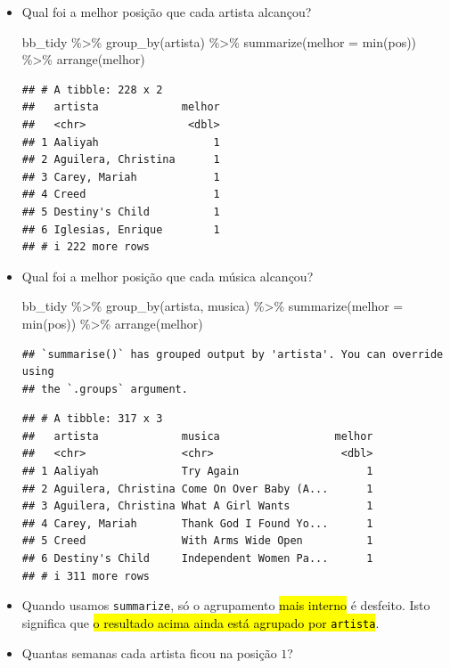 \documentclass[
  11pt]{report}
\newenvironment{Shaded}{\begin{snugshade}}{\end{snugshade}}
\newcommand{\AttributeTok}[1]{\textcolor[rgb]{0.77,0.63,0.00}{#1}}
\newcommand{\FunctionTok}[1]{\textcolor[rgb]{0.00,0.00,0.00}{#1}}
\newcommand{\NormalTok}[1]{#1}
\newcommand{\SpecialCharTok}[1]{\textcolor[rgb]{0.00,0.00,0.00}{#1}}
\renewenvironment{Shaded}{
    \begin{mdframed}[%
      roundcorner=2pt,%
      innerleftmargin=5pt,%
      innerrightmargin=5pt,%
      topline=true,%
      leftline=true,%
      rightline=true,%
      bottomline=true,%
      linewidth=0.5pt,%
      linecolor=black!20,%
      backgroundcolor=black!2,%
      skipabove=2ex,%
      skipbelow=2.5ex%
    ]%
  }
  {
    \end{mdframed}
  }
\begin{document}
\begin{itemize}
\item
  Qual foi a melhor posição que cada artista alcançou?

\begin{Shaded}
\begin{Highlighting}[]
\NormalTok{bb\_tidy }\SpecialCharTok{\%\textgreater{}\%} 
  \FunctionTok{group\_by}\NormalTok{(artista) }\SpecialCharTok{\%\textgreater{}\%} 
  \FunctionTok{summarize}\NormalTok{(}\AttributeTok{melhor =} \FunctionTok{min}\NormalTok{(pos)) }\SpecialCharTok{\%\textgreater{}\%} 
  \FunctionTok{arrange}\NormalTok{(melhor)}
\end{Highlighting}
\end{Shaded}

\begin{verbatim}
## # A tibble: 228 x 2
##   artista             melhor
##   <chr>                <dbl>
## 1 Aaliyah                  1
## 2 Aguilera, Christina      1
## 3 Carey, Mariah            1
## 4 Creed                    1
## 5 Destiny's Child          1
## 6 Iglesias, Enrique        1
## # i 222 more rows
\end{verbatim}
\item
  Qual foi a melhor posição que cada música alcançou?

\begin{Shaded}
\begin{Highlighting}[]
\NormalTok{bb\_tidy }\SpecialCharTok{\%\textgreater{}\%} 
  \FunctionTok{group\_by}\NormalTok{(artista, musica) }\SpecialCharTok{\%\textgreater{}\%} 
  \FunctionTok{summarize}\NormalTok{(}\AttributeTok{melhor =} \FunctionTok{min}\NormalTok{(pos)) }\SpecialCharTok{\%\textgreater{}\%} 
  \FunctionTok{arrange}\NormalTok{(melhor)}
\end{Highlighting}
\end{Shaded}

\begin{verbatim}
## `summarise()` has grouped output by 'artista'. You can override using
## the `.groups` argument.
\end{verbatim}

\begin{verbatim}
## # A tibble: 317 x 3
##   artista             musica                  melhor
##   <chr>               <chr>                    <dbl>
## 1 Aaliyah             Try Again                    1
## 2 Aguilera, Christina Come On Over Baby (A...      1
## 3 Aguilera, Christina What A Girl Wants            1
## 4 Carey, Mariah       Thank God I Found Yo...      1
## 5 Creed               With Arms Wide Open          1
## 6 Destiny's Child     Independent Women Pa...      1
## # i 311 more rows
\end{verbatim}
\item
  Quando usamos \texttt{summarize}, só o agrupamento {\hl{mais interno}} é desfeito. Isto significa que {\hl{o resultado acima ainda está agrupado por {\mbox{\texttt{artista}}}}}.
\item
  Quantas semanas cada artista ficou na posição $1$?


\end{itemize}
\end{document}

